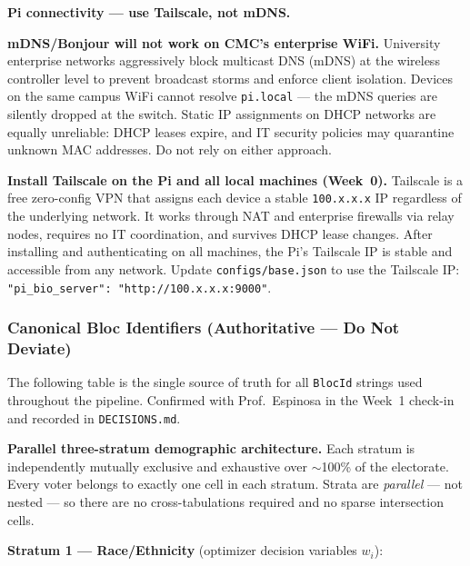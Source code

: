 \documentclass[11pt]{article}
\begin{document}
\medskip
\noindent\textbf{Pi connectivity --- use Tailscale, not mDNS.}

\begin{mdframed}[style=warnbox]
\textbf{mDNS/Bonjour will not work on CMC's enterprise WiFi.}
University enterprise networks aggressively block multicast DNS (mDNS) at the
wireless controller level to prevent broadcast storms and enforce client isolation.
Devices on the same campus WiFi cannot resolve \texttt{pi.local} --- the mDNS
queries are silently dropped at the switch. Static IP assignments on DHCP networks
are equally unreliable: DHCP leases expire, and IT security policies may quarantine
unknown MAC addresses. Do not rely on either approach.

\textbf{Install Tailscale on the Pi and all local machines (Week~0).}
Tailscale is a free zero-config VPN that assigns each device a stable
\texttt{100.x.x.x} IP regardless of the underlying network. It works through
NAT and enterprise firewalls via relay nodes, requires no IT coordination,
and survives DHCP lease changes. After installing and authenticating on all
machines, the Pi's Tailscale IP is stable and accessible from any network.
Update \texttt{configs/base.json} to use the Tailscale IP:
\texttt{"pi\_bio\_server": "http://100.x.x.x:9000"}.
\end{mdframed}

\subsubsection*{Canonical Bloc Identifiers (Authoritative --- Do Not Deviate)}

The following table is the single source of truth for all \texttt{BlocId} strings used
throughout the pipeline. Confirmed with Prof.\ Espinosa in the Week~1 check-in and
recorded in \texttt{DECISIONS.md}.

\textbf{Parallel three-stratum demographic architecture.}
Each stratum is independently mutually exclusive and exhaustive over $\sim$100\%
of the electorate. Every voter belongs to exactly one cell in each stratum.
Strata are \emph{parallel} --- not nested --- so there are no cross-tabulations
required and no sparse intersection cells.

\medskip
\noindent\textbf{Stratum 1 --- Race/Ethnicity} (optimizer decision variables $w_i$):
\end{document}
